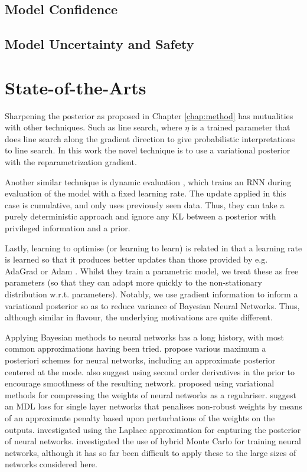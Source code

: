 \subsection{Model Confidence}

\subsection{Model Uncertainty and Safety}

\section{State-of-the-Arts}

Sharpening the posterior as proposed in Chapter \ref{chap:method} has mutualities with other techniques. Such as line search, where $\eta$ is a trained parameter that does line search along the gradient direction to give probabilistic interpretations to line search. In this work the novel technique is to use a variational posterior with the reparametrization gradient.

Another similar technique is dynamic evaluation \cite{Mikolov2010}, which trains an RNN during evaluation of the model with a fixed learning rate. The update applied in this case is cumulative, and only uses previously seen data. Thus, they can take a purely deterministic approach and ignore any KL between a posterior with privileged information and a prior.

Lastly, learning to optimise (or learning to learn) \cite{Li2016a} is related in that a learning rate is learned so that it produces better updates than those provided by e.g. AdaGrad \cite{Duchi2011} or Adam \cite{Kingma2013a}. Whilst they train a parametric model, we treat these as free parameters (so that they can adapt more quickly to the non-stationary distribution w.r.t. parameters). Notably, we use gradient information to inform a variational posterior so as to reduce variance of Bayesian Neural Networks. Thus, although similar in flavour, the underlying motivations are quite different.

Applying Bayesian methods to neural networks has a long history, with most common approximations having been tried.
\citet{buntine1991bayesian} propose various maximum a posteriori schemes for neural networks, including an approximate posterior
centered at the mode.
\citet{buntine1991bayesian} also suggest using second order derivatives in the prior to encourage smoothness of the resulting network.
\cite{Hinton1993} proposed using variational methods for compressing the weights of neural networks as a regulariser.
\cite{Hochreiter1995} suggest an MDL loss for single layer networks that penalises non-robust weights by means of an approximate penalty based upon perturbations of the weights on the outputs.
\cite{Mackay1995} investigated using the Laplace approximation for capturing the posterior of neural networks.
\citet{neal2012bayesian} investigated the use of hybrid Monte Carlo for training neural networks, although it has so far been difficult to apply these to the large sizes of networks considered here.

